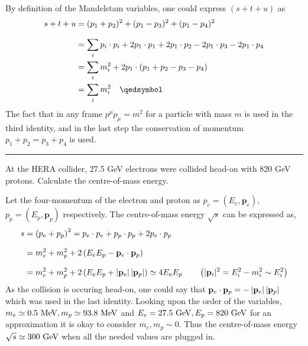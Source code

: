 \begin{solution}
    By definition of the Mandelstam variables, one could express $(s+t+u)$ as 
    \begin{align*}
        s+t+u &= (p_1+p_2)^2 + (p_1-p_3)^2 + (p_1-p_4)^2\\[0.1in]
              &= \sum_i p_i \cdot p_i  + 2p_1\cdot p_1  + 2p_1\cdot p_2 -2 p_1 \cdot p_3 - 2 p_1 \cdot p_4  \\  
              &= \sum_i m_i^2 + 2p_1\cdot(p_1+p_2-p_3-p_4) \\
              &= \sum_i m_i^2 \qed
    \end{align*}
    The fact that in any frame $p^\mu p_\mu =m^2$ for a particle with mass $m$ is used in the third identity, and in the last step the conservation of momentum $p_1+p_2 = p_3+p_4$ is used. 
\end{solution} 
    
\noindent\rule{7in}{1.5pt}


\begin{problem}{2.13}
 At the HERA collider, 27.5 GeV electrons were collided head-on with 820 GeV protons. Calculate the centre-of-mass energy.
\end{problem}
    
\begin{solution}
    Let the four-momentum of the electron and proton as $p_e = (E_e,\mathbf{p}_e),$ $p_p = (E_p,\mathbf{p}_p)$ respectively. The centre-of-mass energy $\sqrt{s}$ can be expressed as,
    \begin{align*}
        s &= \left( p_e + p_p \right)^2 = p_e\cdot p_e + p_p \cdot p_p + 2 p_e \cdot p_p \\[0.1in]
          &= m_e^2 + m_p^2 + 2 \left( E_e E_p - \mathbf{p}_e \cdot \mathbf{p}_p \right) \\[0.1in]
          &= m_e^2 + m_p^2 + 2 \left( E_eE_p + \left| \mathbf{p}_e \right| \left| \mathbf{p}_p \right| \right) \simeq 4 E_e E_p \quad \quad \left(  |\mathbf{p}_i|^2 = E_i^2 - m_i^2 \sim E_i^2  \right)
    \end{align*}
    As the collision is occuring head-on, one could say that $\mathbf{p}_e \cdot \mathbf{p}_p =- \left| \mathbf{p}_e \right| \left| \mathbf{p}_p \right| $ which was used in the last identity.
    Looking upon the order of the variables, $m_e \simeq 0.5 \text{ MeV}, m_p \simeq 93.8 \text{ MeV}$ and $E_e = 27.5 \text{ GeV}, E_p = 820 \text{ GeV}$ for an approximation it is okay to consider $m_e,m_p\sim 0$. Thus the centre-of-mass energy $\sqrt{s}\simeq 300 \text{ GeV}$ when all the needed values are plugged in.
\end{solution}
    
